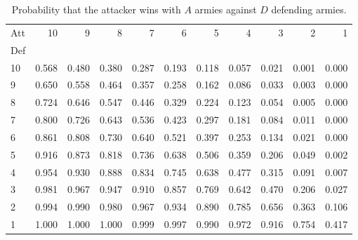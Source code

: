 \documentclass[12pt]{article}
\begin{document}
\begin{small}
    \begin{table}
        \centering
        \begin{tabular}{lrrrrrrrrrr}
            Att    & 10       & 9           & 8            & 7           & 6       & 5          & 4     & 3     & 2     & 1     \\ 
            Def    &          &             &              &             &         &            &       &       &       &       \\ 
            10     & 0.568    & 0.480       & 0.380        & 0.287       & 0.193   & 0.118      & 0.057 & 0.021 & 0.001 & 0.000 \\ 
            9      & 0.650    & 0.558       & 0.464        & 0.357       & 0.258   & 0.162      & 0.086 & 0.033 & 0.003 & 0.000 \\ 
            8      & 0.724    & 0.646       & 0.547        & 0.446       & 0.329   & 0.224      & 0.123 & 0.054 & 0.005 & 0.000 \\ 
            7      & 0.800    & 0.726       & 0.643        & 0.536       & 0.423   & 0.297      & 0.181 & 0.084 & 0.011 & 0.000 \\ 
            6      & 0.861    & 0.808       & 0.730        & 0.640       & 0.521   & 0.397      & 0.253 & 0.134 & 0.021 & 0.000 \\ 
            5      & 0.916    & 0.873       & 0.818        & 0.736       & 0.638   & 0.506      & 0.359 & 0.206 & 0.049 & 0.002 \\ 
            4      & 0.954    & 0.930       & 0.888        & 0.834       & 0.745   & 0.638      & 0.477 & 0.315 & 0.091 & 0.007 \\ 
            3      & 0.981    & 0.967       & 0.947        & 0.910       & 0.857   & 0.769      & 0.642 & 0.470 & 0.206 & 0.027 \\ 
            2      & 0.994    & 0.990       & 0.980        & 0.967       & 0.934   & 0.890      & 0.785 & 0.656 & 0.363 & 0.106 \\ 
            1      & 1.000    & 1.000       & 1.000        & 0.999       & 0.997   & 0.990      & 0.972 & 0.916 & 0.754 & 0.417 \\ 
        \end{tabular}
        \caption{Probability that the attacker wins with \( A \) armies
        against \( D \) defending armies.}%
        \label{tab:riskgame:attackerwins}
    \end{table}
\end{small}
\end{document}
